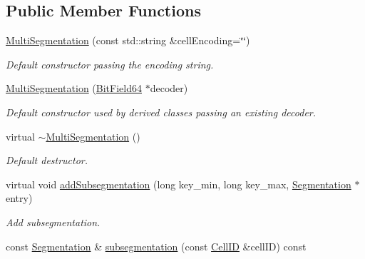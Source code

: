 \subsection*{Public Member Functions}
\begin{DoxyCompactItemize}
\item 
\hyperlink{class_d_d4hep_1_1_d_d_segmentation_1_1_multi_segmentation_ad1a80e739f693a231afc09295a565e85}{MultiSegmentation} (const std::string \&cellEncoding=\char`\"{}\char`\"{})
\begin{DoxyCompactList}\small\item\em Default constructor passing the encoding string. \item\end{DoxyCompactList}\item 
\hyperlink{class_d_d4hep_1_1_d_d_segmentation_1_1_multi_segmentation_a2d73598a701bfad32ba2be3793799bd8}{MultiSegmentation} (\hyperlink{class_d_d4hep_1_1_d_d_segmentation_1_1_bit_field64}{BitField64} $\ast$decoder)
\begin{DoxyCompactList}\small\item\em Default constructor used by derived classes passing an existing decoder. \item\end{DoxyCompactList}\item 
virtual \hyperlink{class_d_d4hep_1_1_d_d_segmentation_1_1_multi_segmentation_ac59d1f2a2145181f48c0c7ffdd13a5ba}{$\sim$MultiSegmentation} ()
\begin{DoxyCompactList}\small\item\em Default destructor. \item\end{DoxyCompactList}\item 
virtual void \hyperlink{class_d_d4hep_1_1_d_d_segmentation_1_1_multi_segmentation_aa92e91f45ba11b074fd6cafb87e15325}{addSubsegmentation} (long key\_\-min, long key\_\-max, \hyperlink{class_d_d4hep_1_1_d_d_segmentation_1_1_segmentation}{Segmentation} $\ast$entry)
\begin{DoxyCompactList}\small\item\em Add subsegmentation. \item\end{DoxyCompactList}\item 
const \hyperlink{class_d_d4hep_1_1_d_d_segmentation_1_1_segmentation}{Segmentation} \& \hyperlink{class_d_d4hep_1_1_d_d_segmentation_1_1_multi_segmentation_aa5766661f6e3194f4bc782b84e7636be}{subsegmentation} (const \hyperlink{namespace_d_d4hep_1_1_d_d_segmentation_ac7af071d85cb48820914434a07e21ba1}{CellID} \&cellID) const 

\end{DoxyCompactItemize}
